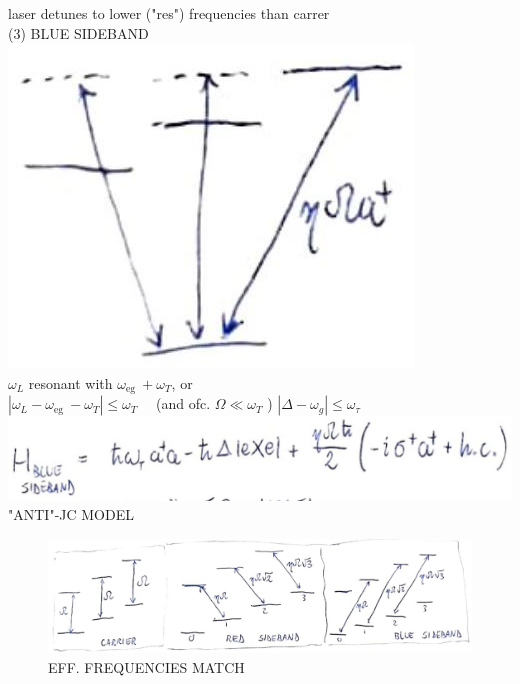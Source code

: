 \documentclass[10pt]{article}
\begin{document}
laser detunes to lower ("res") frequencies than carrer\\
(3) BLUE SIDEBAND\\
\includegraphics[max width=\textwidth, center]{2025_10_16_9146de9f5ba4f09535e7g-5}\\
$\omega_{L}$ resonant with $\omega_{\text {eg }}+\omega_{T}$, or\\
$\left|\omega_{L}-\omega_{\text {eg }}-\omega_{T}\right| \leqslant \omega_{T} \quad$ (and ofc. $\Omega \ll \omega_{T}$ ) $\left|\Delta-\omega_{g}\right| \leqslant \omega_{\tau}$\\
\includegraphics[max width=\textwidth]{2025_10_16_9146de9f5ba4f09535e7g-5(1)} "ANTI"-JC MODEL

\begin{figure}[h]
\begin{center}
  \includegraphics[width=\textwidth]{2025_10_16_9146de9f5ba4f09535e7g-6(1)}
\captionsetup{labelformat=empty}
\caption{EFF. FREQUENCIES MATCH}
\end{center}
\end{figure}
\end{document}
